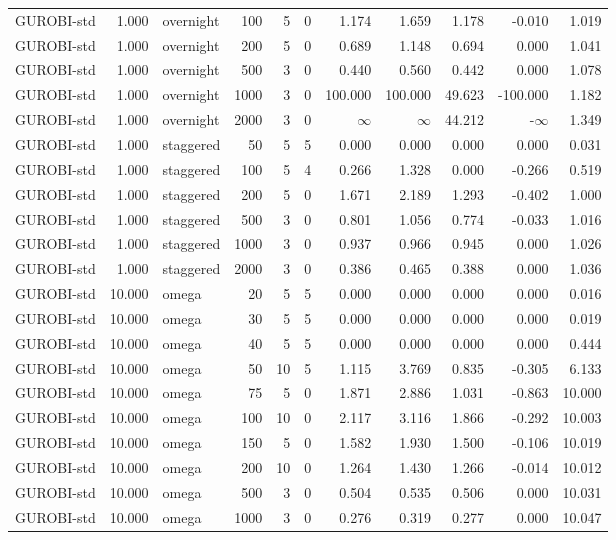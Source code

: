 \begin{table}[htbp]
\begin{tabular}{lrlrrlrrrrr}
GUROBI-std & 1.000 & overnight & 100 & 5 & 0 & 1.174 & 1.659 & 1.178 & -0.010 & 1.019 \\
GUROBI-std & 1.000 & overnight & 200 & 5 & 0 & 0.689 & 1.148 & 0.694 & 0.000 & 1.041 \\
GUROBI-std & 1.000 & overnight & 500 & 3 & 0 & 0.440 & 0.560 & 0.442 & 0.000 & 1.078 \\
GUROBI-std & 1.000 & overnight & 1000 & 3 & 0 & 100.000 & 100.000 & 49.623 & -100.000 & 1.182 \\
GUROBI-std & 1.000 & overnight & 2000 & 3 & 0 & $\infty$ & $\infty$ & 44.212 & -$\infty$ & 1.349 \\
GUROBI-std & 1.000 & staggered & 50 & 5 & 5 & 0.000 & 0.000 & 0.000 & 0.000 & 0.031 \\
GUROBI-std & 1.000 & staggered & 100 & 5 & 4 & 0.266 & 1.328 & 0.000 & -0.266 & 0.519 \\
GUROBI-std & 1.000 & staggered & 200 & 5 & 0 & 1.671 & 2.189 & 1.293 & -0.402 & 1.000 \\
GUROBI-std & 1.000 & staggered & 500 & 3 & 0 & 0.801 & 1.056 & 0.774 & -0.033 & 1.016 \\
GUROBI-std & 1.000 & staggered & 1000 & 3 & 0 & 0.937 & 0.966 & 0.945 & 0.000 & 1.026 \\
GUROBI-std & 1.000 & staggered & 2000 & 3 & 0 & 0.386 & 0.465 & 0.388 & 0.000 & 1.036 \\
GUROBI-std & 10.000 & omega & 20 & 5 & 5 & 0.000 & 0.000 & 0.000 & 0.000 & 0.016 \\
GUROBI-std & 10.000 & omega & 30 & 5 & 5 & 0.000 & 0.000 & 0.000 & 0.000 & 0.019 \\
GUROBI-std & 10.000 & omega & 40 & 5 & 5 & 0.000 & 0.000 & 0.000 & 0.000 & 0.444 \\
GUROBI-std & 10.000 & omega & 50 & 10 & 5 & 1.115 & 3.769 & 0.835 & -0.305 & 6.133 \\
GUROBI-std & 10.000 & omega & 75 & 5 & 0 & 1.871 & 2.886 & 1.031 & -0.863 & 10.000 \\
GUROBI-std & 10.000 & omega & 100 & 10 & 0 & 2.117 & 3.116 & 1.866 & -0.292 & 10.003 \\
GUROBI-std & 10.000 & omega & 150 & 5 & 0 & 1.582 & 1.930 & 1.500 & -0.106 & 10.019 \\
GUROBI-std & 10.000 & omega & 200 & 10 & 0 & 1.264 & 1.430 & 1.266 & -0.014 & 10.012 \\
GUROBI-std & 10.000 & omega & 500 & 3 & 0 & 0.504 & 0.535 & 0.506 & 0.000 & 10.031 \\
GUROBI-std & 10.000 & omega & 1000 & 3 & 0 & 0.276 & 0.319 & 0.277 & 0.000 & 10.047 \\

\end{tabular}
\end{table}
